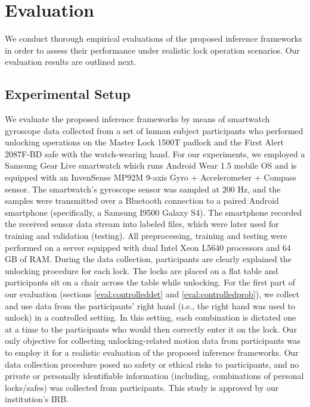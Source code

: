 \documentclass[]{IEEEtran}
\begin{document}
\section{Evaluation}
\label{evaluation}
We conduct thorough empirical evaluations of the proposed inference frameworks in order to assess their performance under realistic lock operation scenarios. Our evaluation results are outlined next.

\subsection{Experimental Setup}
We evaluate the proposed inference frameworks by means of smartwatch gyroscope data collected from a set of human subject participants who performed unlocking operations on the Master Lock 1500T padlock and the First Alert 2087F-BD safe with the watch-wearing hand. For our experiments, we employed a Samsung Gear Live smartwatch which runs Android Wear 1.5 mobile OS and is equipped with an InvenSense MP92M 9-axis Gyro + Accelerometer + Compass sensor. The smartwatch's gyroscope sensor was sampled at 200 Hz, and the samples were transmitted over a Bluetooth connection to a paired Android smartphone (specifically, a Samsung I9500 Galaxy S4). The smartphone recorded the received sensor data stream into labeled files, which were later used for training and validation (testing). All preprocessing, training and testing were performed on a server equipped with dual Intel Xeon L5640 processors and 64 GB of RAM. During the data collection, participants are clearly explained the unlocking procedure for each lock. The locks are placed on a flat table and participants sit on a chair across the table while unlocking. For the first part of our evaluation (sections \ref{eval:controlleddet} and \ref{eval:controlledprob}), we collect and use data from the participants' right hand (i.e., the right hand was used to unlock) in a controlled setting. In this setting, each combination is dictated one at a time to the participants who would then correctly enter it on the lock. Our only objective for collecting unlocking-related motion data from participants was to employ it for a realistic evaluation of the proposed inference frameworks. Our data collection procedure posed no safety or ethical risks to participants, and no private or personally identifiable information (including, combinations of personal locks/safes) was collected from participants. This study is approved by our institution's IRB.
\end{document}

